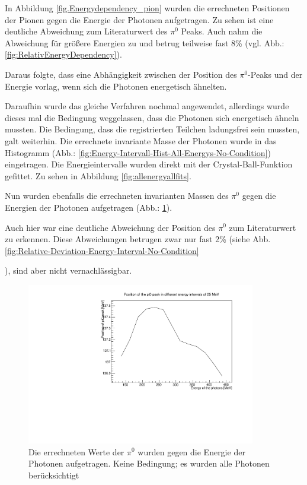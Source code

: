 \documentclass[a4paper,11pt,oneside,final,german,openbib,pdftex]{scrbook}
\begin{document}
{In Abbildung \ref{fig.Energydependency_pion} wurden die errechneten Positionen der Pionen gegen die Energie der Photonen aufgetragen. Zu sehen ist eine deutliche Abweichung zum Literaturwert des $\pi^0$ Peaks. Auch nahm die Abweichung für größere Energien zu und betrug teilweise fast 8\% (vgl. Abb.:\ref{fig:RelativEnergyDependency}).
  
Daraus folgte, dass eine Abhängigkeit zwischen der Position des $\pi^0$-Peaks und der Energie vorlag, wenn sich die Photonen energetisch ähnelten.

Daraufhin wurde das gleiche Verfahren nochmal angewendet, allerdings wurde dieses mal die Bedingung weggelassen, dass die Photonen sich energetisch ähneln mussten. Die Bedingung, dass die registrierten Teilchen ladungsfrei sein mussten, galt weiterhin. Die errechnete invariante Masse der Photonen wurde in das Histogramm (Abb.: \ref{fig:Energy-Intervall-Hist-All-Energys-No-Condition}) eingetragen. Die Energieintervalle wurden direkt mit der Crystal-Ball-Funktion gefittet. Zu sehen in Abbildung \ref{fig:allenergyallfits}. 

Nun wurden ebenfalls die errechneten invarianten Massen des $\pi^0$ gegen die Energien der Photonen aufgetragen (Abb.: \ref{fig:Energy-Intervall-No-Condition-Deviation-1303}). 

Auch hier war eine deutliche Abweichung der Position des $\pi^0$ zum Literaturwert zu erkennen. Diese Abweichungen betrugen zwar nur fast 2\% (siehe Abb. \ref{fig:Relative-Deviation-Energy-Interval-No-Condition}}), sind aber nicht vernachl\"assigbar. 


\begin{figure}[h!]
	\begin{center}
		\includegraphics[width=100mm]{RealDataEnergyIntervalAllPhotonsDeviation}
		\caption{Die errechneten Werte der $\pi^0$ wurden gegen die Energie der Photonen aufgetragen. Keine Bedingung; es wurden alle Photonen ber\"ucksichtigt}
		\label{fig:Energy-Intervall-No-Condition-Deviation-1303}
	\end{center}
\end{figure}
\end{document}
